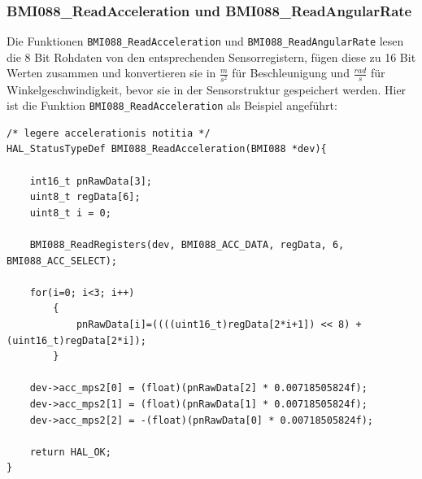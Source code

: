 \subsubsection{BMI088\_ReadAcceleration und BMI088\_ReadAngularRate}
Die Funktionen \texttt{BMI088\_ReadAcceleration} und \texttt{BMI088\_ReadAngularRate} lesen die 8 Bit Rohdaten von den entsprechenden Sensorregistern, fügen diese zu 16 Bit Werten zusammen und konvertieren sie in $\frac{m}{s^2}$ für Beschleunigung und $\frac{rad}{s}$ für Winkelgeschwindigkeit, bevor sie in der Sensorstruktur gespeichert werden. Hier ist die Funktion \texttt{BMI088\_ReadAcceleration} als Beispiel angeführt: 
\begin{lstlisting}[style=cstyle, caption={Beschleunigungsdaten lesen}, label={lst:read_acceleration}]
/* legere accelerationis notitia */
HAL_StatusTypeDef BMI088_ReadAcceleration(BMI088 *dev){

	int16_t pnRawData[3];
	uint8_t regData[6];
	uint8_t i = 0;

	BMI088_ReadRegisters(dev, BMI088_ACC_DATA, regData, 6, BMI088_ACC_SELECT);

	for(i=0; i<3; i++)
		{
			pnRawData[i]=((((uint16_t)regData[2*i+1]) << 8) + (uint16_t)regData[2*i]);
		}

	dev->acc_mps2[0] = (float)(pnRawData[2] * 0.00718505824f);
	dev->acc_mps2[1] = (float)(pnRawData[1] * 0.00718505824f);
	dev->acc_mps2[2] = -(float)(pnRawData[0] * 0.00718505824f);

	return HAL_OK;
}
\end{lstlisting}


